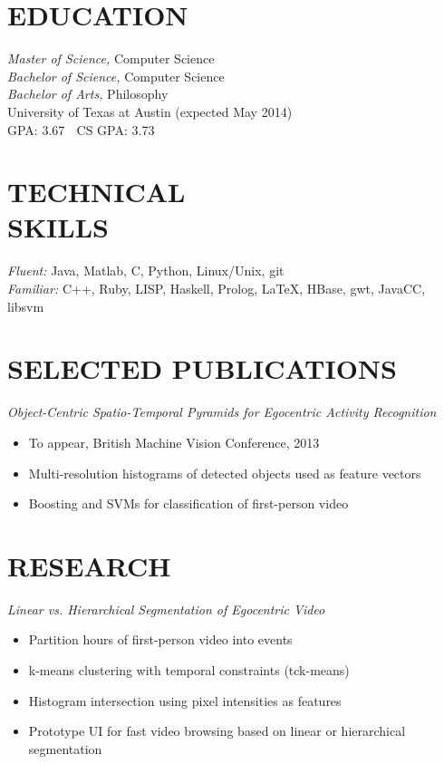 \documentclass[line,margin]{res}
\begin{document}
\address{\textbf{email:} tomas.mccandless@gmail.com, \textbf{phone:} (210) 232-1477} 
\address{\textbf{web:} tomasmccandless.com}

 
\begin{resume}
 
 
\section{EDUCATION} {\sl Master of Science,} Computer Science \\
                    {\sl Bachelor of Science,} Computer Science \\
										{\sl Bachelor of Arts,} Philosophy \\
                University of Texas at Austin 
                (expected May 2014) \\
								GPA: 3.67  $\;$ CS GPA: 3.73 
 
\section{TECHNICAL \\ SKILLS} {\sl Fluent:} Java, Matlab, C, Python, Linux/Unix, git \\
                {\sl Familiar:} C++, Ruby, LISP, Haskell, Prolog, \LaTeX, HBase, gwt, JavaCC, libsvm \\


                              \section{SELECTED PUBLICATIONS} {\sl Object-Centric Spatio-Temporal Pyramids for Egocentric Activity Recognition}
	\begin{itemize} \itemsep -2pt
  \item To appear, British Machine Vision Conference, 2013
	\item Multi-resolution histograms of detected objects used as feature vectors
	\item Boosting and SVMs for classification of first-person video
	\end{itemize}


\section{RESEARCH} {\sl Linear vs. Hierarchical Segmentation of Egocentric Video} 
	\begin{itemize} \itemsep -2pt
	\item Partition hours of first-person video into events 
	\item k-means clustering with temporal constraints (tck-means)
	\item Histogram intersection using pixel intensities as features
	\item Prototype UI for fast video browsing based on linear or hierarchical segmentation
	\end{itemize}


\end{resume}
\end{document}
